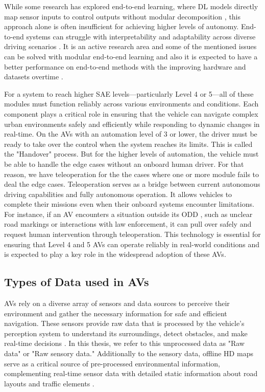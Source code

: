 While some research has explored end-to-end learning, where \ac{DL} models directly map sensor inputs
to control outputs without modular decomposition \cite{codevilla2019limitations}, this approach alone is often
insufficient for achieving higher levels of autonomy. End-to-end systems can struggle with interpretability
and adaptability across diverse driving scenarios \cite{e2e}. It is an active research area and some
of the mentioned issues can be solved with modular end-to-end learning \cite{nvidia2022diffstack} and also
it is expected to have a better performance on end-to-end methods with the improving hardware and datasets overtime \cite{e2e}.

For a system to reach higher SAE levels—particularly Level 4 or 5—all of
these modules must function reliably across various environments and conditions.
Each component plays a critical role in ensuring that the vehicle can navigate complex urban
environments safely and efficiently while responding to dynamic changes in real-time.
On the \acp{AV} with an automation level of 3 or lower, the driver must be ready to take over the control
when the system reaches its limits. This is called the "Handover" process.
But for the higher levels of automation, the vehicle must be able to handle the edge cases without an onboard human driver.
For that reason, we have teleoperation for the the cases where one or more module fails to deal the edge cases.
Teleoperation serves as a bridge between current autonomous driving capabilities and fully autonomous operation.
It allows vehicles to complete their missions even when their onboard systems encounter limitations.
For instance, if an \ac{AV} encounters a situation outside its \ac{ODD} \cite{iso34503},
such as unclear road markings or interactions with law enforcement, it can pull over safely and request human
intervention through teleoperation.
This technology is essential for ensuring that Level 4 and 5 \acp{AV} can operate reliably in real-world conditions
and is expected to play a key role in the widespread adoption of these \acp{AV}.


\subsection{Types of Data used in \acp{AV}} \label{subsection:sensors}
\acp{AV} rely on a diverse array of sensors and data sources to perceive their environment and gather the necessary
information for safe and efficient navigation. These sensors provide raw data that is
processed by the vehicle's perception system to understand
its surroundings, detect obstacles, and make real-time
decisions \cite{thrun2006stanley}.
In this thesis, we refer to this unprocessed data as
"Raw data" or "Raw sensory data." Additionally to the sensory data,
offline HD maps serve as a critical source of pre-processed environmental information,
complementing real-time sensor data with detailed static information about road layouts
and traffic elements \cite{bansal2018hdmaps,zhu2021hdmaps}.

